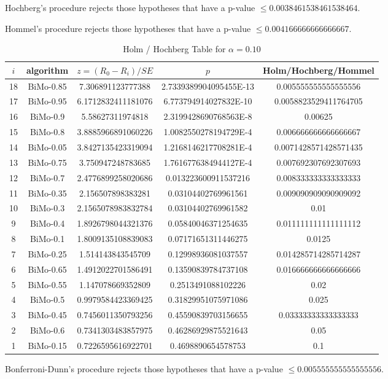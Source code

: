\documentclass[a4paper,10pt]{article}
\begin{document}
\begin{landscape}
Hochberg's procedure rejects those hypotheses that have a p-value $\le0.0038461538461538464$.


Hommel's procedure rejects those hypotheses that have a p-value $\le0.004166666666666667$.


\begin{table}[!htp]
\centering\tiny
\caption{Holm / Hochberg Table for $\alpha=0.10$}
\begin{tabular}{ccccc}
$i$&algorithm&$z=(R_0 - R_i)/SE$&$p$&Holm/Hochberg/Hommel\\
\hline
18&BiMo-0.85&7.306891123777388&2.7339389904095455E-13&0.005555555555555556\\
17&BiMo-0.95&6.1712832411181076&6.773794914027832E-10&0.0058823529411764705\\
16&BiMo-0.9&5.58627311974818&2.3199428690768563E-8&0.00625\\
15&BiMo-0.8&3.8885966891060226&1.0082550278194729E-4&0.006666666666666667\\
14&BiMo-0.05&3.8427135423319094&1.2168146217708281E-4&0.0071428571428571435\\
13&BiMo-0.75&3.750947248783685&1.7616776384944127E-4&0.007692307692307693\\
12&BiMo-0.7&2.4776899258020686&0.013223600911537216&0.008333333333333333\\
11&BiMo-0.35&2.156507898383281&0.03104402769961561&0.009090909090909092\\
10&BiMo-0.3&2.1565078983832784&0.03104402769961582&0.01\\
9&BiMo-0.4&1.8926798044321376&0.05840046371254635&0.011111111111111112\\
8&BiMo-0.1&1.8009135108839083&0.07171651311446275&0.0125\\
7&BiMo-0.25&1.514143843545709&0.12998936081037557&0.014285714285714287\\
6&BiMo-0.65&1.4912022701586491&0.13590839784737108&0.016666666666666666\\
5&BiMo-0.55&1.147078669352809&0.2513491088102226&0.02\\
4&BiMo-0.5&0.9979584423369425&0.31829951075971086&0.025\\
3&BiMo-0.45&0.7456011350793256&0.45590839703156655&0.03333333333333333\\
2&BiMo-0.6&0.7341303483857975&0.46286929875521643&0.05\\
1&BiMo-0.15&0.7226595616922701&0.4698890654578753&0.1\\
\hline
\end{tabular}
\end{table}
Bonferroni-Dunn's procedure rejects those hypotheses that have a p-value $\le0.005555555555555556$.



\end{landscape}
\end{document}
